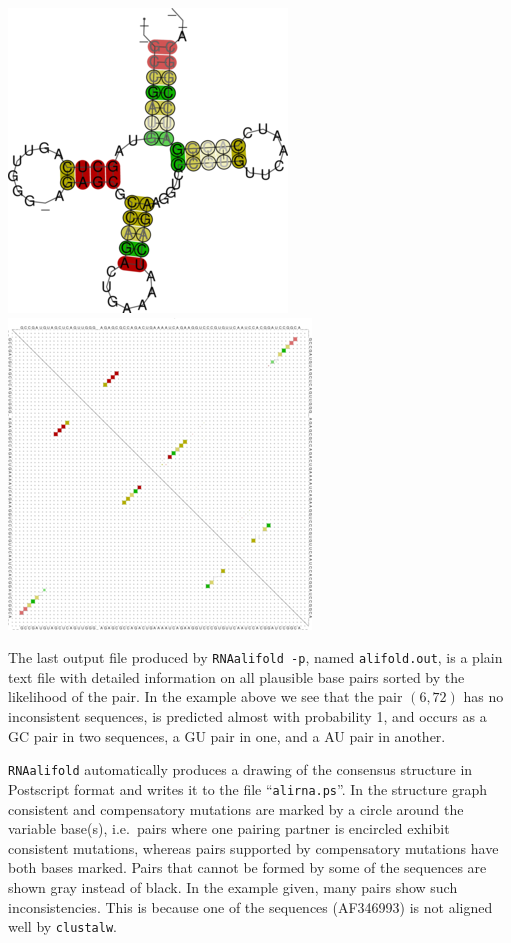 \documentclass[]{article}
\begin{document}
\includegraphics{Figs/alirna.png}
\includegraphics{Figs/alidot.png}

The last output file produced by \texttt{RNAalifold\ -p}, named
\texttt{alifold.out}, is a plain text file with detailed information on
all plausible base pairs sorted by the likelihood of the pair. In the
example above we see that the pair \(\left( {6,72} \right)\) has no
inconsistent sequences, is predicted almost with probability 1, and
occurs as a GC pair in two sequences, a GU pair in one, and a AU pair in
another.

\texttt{RNAalifold} automatically produces a drawing of the consensus
structure in Postscript format and writes it to the file
``\texttt{alirna.ps}''. In the structure graph consistent and
compensatory mutations are marked by a circle around the variable
base(s), i.e.~pairs where one pairing partner is encircled exhibit
consistent mutations, whereas pairs supported by compensatory mutations
have both bases marked. Pairs that cannot be formed by some of the
sequences are shown gray instead of black. In the example given, many
pairs show such inconsistencies. This is because one of the sequences
(AF346993) is not aligned well by \texttt{clustalw}.
\end{document}
